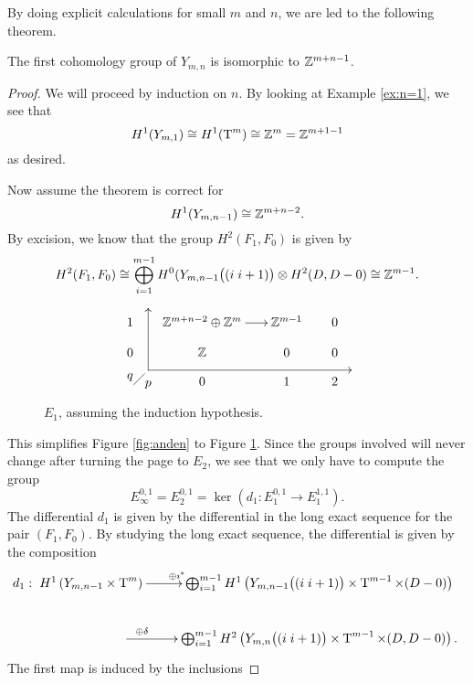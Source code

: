 By doing explicit calculations for small $m$ and $n$, we are led to
the following theorem. 

\begin{theorem}
  \label{thm:forste}
  The first cohomology group of $Y_{m,n}$ is isomorphic to $\mathbb{Z}^{m+n-1}$.
\end{theorem}
\begin{proof}
  We will proceed by induction on $n$. By looking at Example
  \ref{ex:n=1}, we see that
  \[ H^1(Y_{m,1}) \cong H^1(\operatorname{T}^{m}) \cong \mathbb{Z}^m = \mathbb{Z}^{m+1-1} \]
  as desired.

  Now assume the theorem is correct for 
  \[ H^1(Y_{m,n-1}) \cong \mathbb{Z}^{m+n-2}. \] 
  By excision, we know that the group $H^2(F_1,F_0)$ is given by
  \[ H^2(F_1,F_0) \cong \bigoplus_{i=1}^{m-1} H^0(Y_{m,n-1}\big((i\;
  i+1)\big) \otimes H^2(D,D-0) \cong \mathbb{Z}^{m-1}. \]
  \begin{figure}[ht]
    \[ \xy
    (5,4); (5,-13); **\dir{-}; (5,4); *\dir{>};
    (5,-13); (61,-13); **\dir{-}; *\dir{<};
    (0,-15)*{q}; (5,-17)*{p};
    (1,-17); (4,-14); **\dir{-};
    (0,0)\xymatrix@R=1em@C=1.7em{
      1 & \Z^{m+n-2}\oplus\Z^m \ar[r]& \Z^{m-1} & 0 \\
      0 & \Z & 0 & 0 \\
      & 0 & 1 & 2
    } \endxy \]
    \caption{$E_1$, assuming the induction hypothesis.}
    \label{fig:tredje}
  \end{figure}
  This simplifies Figure \ref{fig:anden} to Figure
  \ref{fig:tredje}. Since the groups involved will never change after
  turning the page to $E_2$, we see that we only have to compute the
  group
  \[ E_\infty^{0,1} = E_2^{0,1} = \ker \left( d_1 : E_1^{0,1} \to
    E_1^{1,1} \right). \]
  The differential $d_1$ is given by the differential in the long
  exact sequence for the pair $(F_1,F_0)$. By studying the long exact
  sequence, the differential is given by the composition
  \[ d_1 : \xymatrix{ H^1\left(Y_{m,n-1}\times \T^m\right)
    \ar[r]^<<<<<<<<<{\oplus\imath^*}  & \bigoplus_{i=1}^{m-1}
    H^1\left(Y_{m,n-1}\big((i\; i+1)\big)\times \T^{m-1} \times
      (D-0)\right)  \\
    \hspace{5em}\ar[r]^<<<<<{\oplus\delta} & \bigoplus_{i=1}^{m-1}
    H^2\left(Y_{m,n}\big((i\; i+1)\big)\times \T^{m-1} \times
      (D,D-0)\right).}\] 
  The first map is induced by the inclusions

\end{proof}
